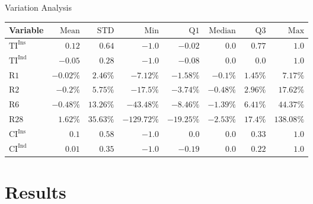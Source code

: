 \documentclass{beamer}
\begin{document}
\begin{frame}{Variation Analysis}
    \centering
    \fontsize{8}{8} \selectfont
    \begin{tabular}{lrrrrrrr}
        \toprule
        Variable              & \(\mathrm{Mean}\)    & \(\mathrm{STD}\)     & \(\mathrm{Min}\)       & \(\mathrm{Q1}\)       & \(\mathrm{Median}\)  & \(\mathrm{Q3}\)     & \(\mathrm{Max}\)      \\
        \midrule
        \(\mathrm{TI^{Ins}}\) & \(\mathrm{0.12}\)    & \(\mathrm{0.64}\)    & \(\mathrm{-1.0}\)      & \(\mathrm{-0.02}\)    & \(\mathrm{0.0}\)     & \(\mathrm{0.77}\)   & \(\mathrm{1.0}\)      \\
        \(\mathrm{TI^{Ind}}\) & \(\mathrm{-0.05}\)   & \(\mathrm{0.28}\)    & \(\mathrm{-1.0}\)      & \(\mathrm{-0.08}\)    & \(\mathrm{0.0}\)     & \(\mathrm{0.0}\)    & \(\mathrm{1.0}\)      \\
        \(\mathrm{R1}\)       & \(\mathrm{-0.02\%}\) & \(\mathrm{2.46\%}\)  & \(\mathrm{-7.12\%}\)   & \(\mathrm{-1.58\%}\)  & \(\mathrm{-0.1\%}\)  & \(\mathrm{1.45\%}\) & \(\mathrm{7.17\%}\)   \\
        \(\mathrm{R2}\)       & \(\mathrm{-0.2\%}\)  & \(\mathrm{5.75\%}\)  & \(\mathrm{-17.5\%}\)   & \(\mathrm{-3.74\%}\)  & \(\mathrm{-0.48\%}\) & \(\mathrm{2.96\%}\) & \(\mathrm{17.62\%}\)  \\
        \(\mathrm{R6}\)       & \(\mathrm{-0.48\%}\) & \(\mathrm{13.26\%}\) & \(\mathrm{-43.48\%}\)  & \(\mathrm{-8.46\%}\)  & \(\mathrm{-1.39\%}\) & \(\mathrm{6.41\%}\) & \(\mathrm{44.37\%}\)  \\
        \(\mathrm{R28}\)      & \(\mathrm{1.62\%}\)  & \(\mathrm{35.63\%}\) & \(\mathrm{-129.72\%}\) & \(\mathrm{-19.25\%}\) & \(\mathrm{-2.53\%}\) & \(\mathrm{17.4\%}\) & \(\mathrm{138.08\%}\) \\
        \(\mathrm{CI^{Ins}}\) & \(\mathrm{0.1}\)     & \(\mathrm{0.58}\)    & \(\mathrm{-1.0}\)      & \(\mathrm{0.0}\)      & \(\mathrm{0.0}\)     & \(\mathrm{0.33}\)   & \(\mathrm{1.0}\)      \\
        \(\mathrm{CI^{Ind}}\) & \(\mathrm{0.01}\)    & \(\mathrm{0.35}\)    & \(\mathrm{-1.0}\)      & \(\mathrm{-0.19}\)    & \(\mathrm{0.0}\)     & \(\mathrm{0.22}\)   & \(\mathrm{1.0}\)      \\
        \bottomrule
    \end{tabular}
\end{frame}

\section{Results}
\end{document}
